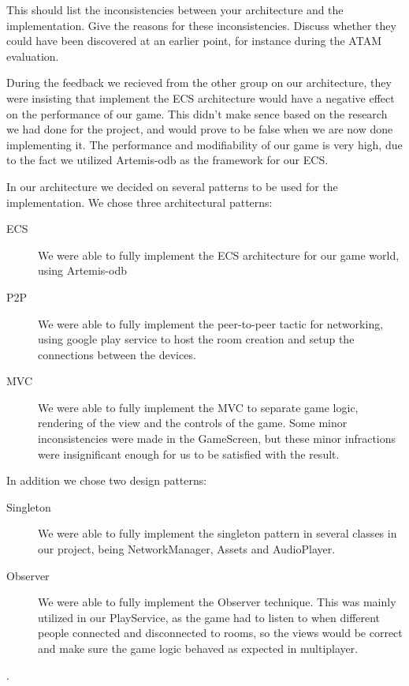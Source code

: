 
This should list the inconsistencies between your architecture and the implementation. Give the reasons for these inconsistencies. Discuss whether they could have been discovered at an earlier point, for instance during the ATAM evaluation.\\



During the feedback we recieved from the other group on our architecture, they were insisting that implement the ECS architecture would have a negative effect on the performance of our game. This didn’t make sence based on the research we had done for the project, and would prove to be false when we are now done implementing it. The performance and modifiability of our game is very high, due to the fact we utilized Artemis-odb as the framework for our ECS.



In our architecture we decided on several patterns to be used for the implementation. We chose three architectural patterns: 


\begin{description}
	\item [ECS] We were able to fully implement the ECS architecture for our game world, using Artemis-odb
	\item [P2P] We were able to fully implement the peer-to-peer tactic for networking, using google play service to host the room creation and setup the connections between the devices.
	\item [MVC] We were able to fully implement the MVC to separate game logic, rendering of the view and the controls of the game. Some minor inconsistencies were made in the GameScreen, but these minor infractions were insignificant enough for us to be satisfied with the result.
\end{description}


In addition we chose two design patterns:

\begin{description}
	\item [Singleton] We were able to fully implement the singleton pattern in several classes in our project, being NetworkManager, Assets and AudioPlayer.
	\item [Observer] We were able to fully implement the Observer technique. This was mainly utilized in our PlayService, as the game had to listen to when different people connected and disconnected to rooms, so the views would be correct and make sure the game logic behaved as expected in multiplayer.
\end{description} .

